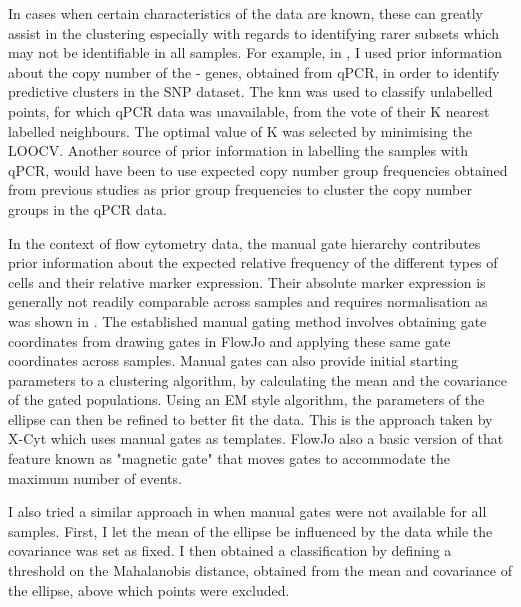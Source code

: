 In cases when certain characteristics of the data are known, these can greatly assist in the clustering especially with regards to identifying rarer subsets which may not be identifiable in all samples.
For example, in , I used prior information about the copy number of the - genes, obtained from qPCR, in order to identify predictive clusters in the SNP dataset.
The \gls{knn} was used to classify unlabelled points, for which qPCR data was unavailable, from the vote of their K nearest labelled neighbours.
The optimal value of K was selected by minimising the \gls{LOOCV}.
Another source of prior information in labelling the samples with qPCR, would have been to use expected copy number group frequencies obtained from previous studies \citep{Jiang:2012cf} as prior group frequencies to cluster the copy number groups in the qPCR data.

In the context of flow cytometry data, the manual gate hierarchy contributes prior information about the expected relative frequency of the different types of cells and their relative marker expression.
Their absolute marker expression is generally not readily comparable across samples and requires normalisation as was shown in .
The established manual gating method involves obtaining gate coordinates from drawing gates in FlowJo and applying these same
gate coordinates across samples.
Manual gates can also provide initial starting parameters to a clustering algorithm,
by calculating the mean and the covariance of the gated populations.
Using an EM style algorithm, the parameters of the ellipse can then be refined to better fit the data.
This is the approach taken by X-Cyt \citep{Hu:2013bg} which uses manual gates as templates.
FlowJo also a basic version of that feature known as "magnetic gate" that moves gates to accommodate the maximum number of events.

I also tried a similar approach in  when manual gates were not available for all samples.
First, I let the mean of the ellipse be influenced by the data while the covariance was set as fixed.
I then obtained a classification by defining a threshold on the Mahalanobis distance, obtained from the mean and covariance of the ellipse, above which points were excluded.

